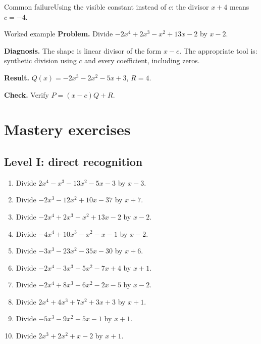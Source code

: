 \documentclass[11pt,oneside]{book}
\begin{document}
\begin{warningbox}{Common failure}Using the visible constant instead of $c$: the divisor $x+4$ means $c=-4$.\end{warningbox}
\begin{examplebox}{Worked example}
\textbf{Problem.} Divide $ - 2 x^{4} + 2 x^{3} - x^{2} + 13 x - 2 $ by $x - 2$.

\textbf{Diagnosis.} The shape is linear divisor of the form $x-c$. The appropriate tool is: synthetic division using $c$ and every coefficient, including zeros.

\textbf{Result.} $Q(x)=- 2 x^{3} - 2 x^{2} - 5 x + 3$, $R=4$.

\textbf{Check.} Verify $P=(x-c)Q+R$.
\end{examplebox}
\section{Mastery exercises}
\subsection*{Level I: direct recognition}
\begin{enumerate}[leftmargin=*,label=\textbf{\arabic*.},itemsep=0.65\baselineskip]
\item Divide $ 2 x^{4} - x^{3} - 13 x^{2} - 5 x - 3 $ by $x - 3$.
\item Divide $ - 2 x^{3} - 12 x^{2} + 10 x - 37 $ by $x + 7$.
\item Divide $ - 2 x^{4} + 2 x^{3} - x^{2} + 13 x - 2 $ by $x - 2$.
\item Divide $ - 4 x^{4} + 10 x^{3} - x^{2} - x - 1 $ by $x - 2$.
\item Divide $ - 3 x^{3} - 23 x^{2} - 35 x - 30 $ by $x + 6$.
\item Divide $ - 2 x^{4} - 3 x^{3} - 5 x^{2} - 7 x + 4 $ by $x + 1$.
\item Divide $ - 2 x^{4} + 8 x^{3} - 6 x^{2} - 2 x - 5 $ by $x - 2$.
\item Divide $ 2 x^{4} + 4 x^{3} + 7 x^{2} + 3 x + 3 $ by $x + 1$.
\item Divide $ - 5 x^{3} - 9 x^{2} - 5 x - 1 $ by $x + 1$.
\item Divide $ 2 x^{3} + 2 x^{2} + x - 2 $ by $x + 1$.
\end{enumerate}
\end{document}
